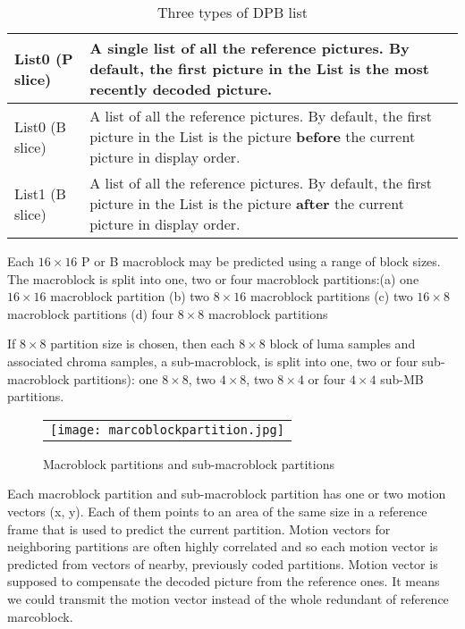 \documentclass[../main.tex]{subfiles}
\begin{document}
\begin{table}[ht]
\label{tab:list}
\begin{center}       
\begin{tabular}{|l|l|} 
\hline
\rule[-1ex]{0pt}{3.5ex}  List0 (P slice) & A single list of all the reference pictures.  By default, the first picture in
the List is the most recently decoded picture.\\  %
\hline
\rule[-1ex]{0pt}{3.5ex}  List0 (B slice) & A list of all the reference pictures. By default, the first picture in the List
is the picture \textbf {before} the current picture in display order.   \\%
\hline
\rule[-1ex]{0pt}{3.5ex}  List1 (B slice) & A list of all the reference pictures. By default, the first picture in the List
is the picture \textbf {after} the current picture in display order.  \\%
\hline

\end{tabular}
\end{center}
\caption{Three types of DPB list} 
\end{table}

Each $16 \times 16$ P or B macroblock may be predicted using a range
of block sizes. The macroblock is split into one, two or four
macroblock partitions:(a) one $16 \times 16$ macroblock partition (b) two $8 \times 16$ macroblock partitions
(c) two $16 \times 8$ macroblock partitions (d) four $8 \times 8$ macroblock partitions

If $8 \times 8$ partition size is chosen, then each $8 \times 8$ block of luma samples and associated chroma
samples, a sub-macroblock, is split into one, two or four sub-macroblock partitions): one
$8 \times 8$, two $4 \times 8$, two $8 \times 4$ or four $4 \times 4$ sub-MB partitions.

\begin{figure} [ht]
   \begin{center}
   \begin{tabular}{c} %
   \texttt{[image: marcoblockpartition.jpg]}
   \end{tabular}
   \end{center}
   \caption[example] 
   { \label{fig:example1} 
Macroblock partitions and sub-macroblock partitions}
   \end{figure}     %
   
Each macroblock partition and sub-macroblock partition has one or two motion vectors (x, y). Each of them points to an area of the same size in a reference frame that is used to predict the current partition. Motion vectors for neighboring partitions are often highly correlated and so each motion vector is predicted from vectors of nearby, previously coded partitions. Motion vector is supposed to compensate the decoded picture from the reference ones. It means we could transmit the motion vector instead of the whole redundant of reference marcoblock.
\end{document}
